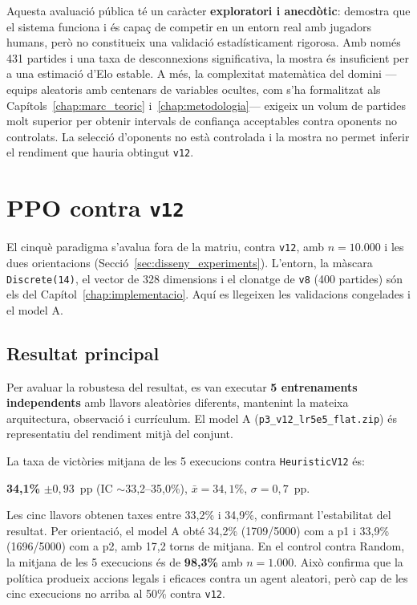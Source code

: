 Aquesta avaluació pública té un caràcter \textbf{exploratori i anecdòtic}: demostra que el sistema funciona i és capaç de competir en un entorn real amb jugadors humans, però no constitueix una validació estadísticament rigorosa. Amb només 431 partides i una taxa de desconnexions significativa, la mostra és insuficient per a una estimació d'Elo estable. A més, la complexitat matemàtica del domini ---equips aleatoris amb centenars de variables ocultes, com s'ha formalitzat als Capítols~\ref{chap:marc_teoric} i~\ref{chap:metodologia}--- exigeix un volum de partides molt superior per obtenir intervals de confiança acceptables contra oponents no controlats. La selecció d'oponents no està controlada i la mostra no permet inferir el rendiment que hauria obtingut \texttt{v12}.

\FloatBarrier
\section{PPO contra \texttt{v12}}
\label{sec:res_ppo}

El cinquè paradigma s'avalua fora de la matriu, contra \texttt{v12}, amb $n=10.000$ i les dues orientacions (Secció~\ref{sec:disseny_experiments}). L'entorn, la màscara \texttt{Discrete(14)}, el vector de 328 dimensions i el clonatge de \texttt{v8} (400 partides) són els del Capítol~\ref{chap:implementacio}. Aquí es llegeixen les validacions congelades i el model A.



\subsection{Resultat principal}

Per avaluar la robustesa del resultat, es van executar \textbf{5 entrenaments independents} amb llavors aleatòries diferents, mantenint la mateixa arquitectura, observació i currículum. El model A (\texttt{p3\_v12\_lr5e5\_flat.zip}) és representatiu del rendiment mitjà del conjunt.

La taxa de victòries mitjana de les 5 execucions contra \texttt{HeuristicV12} és:

\begin{center}
\textbf{34,1\%} \quad $\pm 0{,}93$~pp \quad (IC $\sim$33,2--35,0\%), \quad $\bar{x} = 34{,}1\%$, $\sigma = 0{,}7$~pp.
\end{center}

Les cinc llavors obtenen taxes entre 33,2\% i 34,9\%, confirmant l'estabilitat del resultat. Per orientació, el model A obté 34,2\% (1709/5000) com a p1 i 33,9\% (1696/5000) com a p2, amb 17,2 torns de mitjana. En el control contra Random, la mitjana de les 5 execucions és de \textbf{98,3\%} amb $n=1.000$. Això confirma que la política produeix accions legals i eficaces contra un agent aleatori, però cap de les cinc execucions no arriba al 50\% contra \texttt{v12}.

